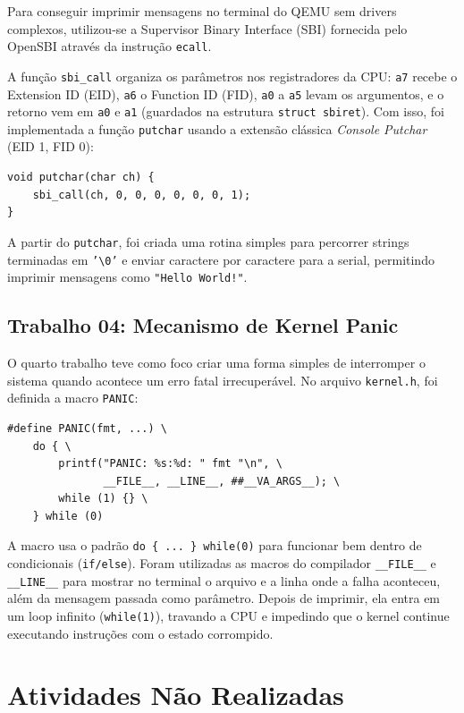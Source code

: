 \documentclass[12pt]{article}
\begin{document}
Para conseguir imprimir mensagens no terminal do QEMU sem drivers complexos, utilizou-se a Supervisor Binary Interface (SBI) fornecida pelo OpenSBI através da instrução \texttt{ecall}.

A função \texttt{sbi\_call} organiza os parâmetros nos registradores da CPU: \texttt{a7} recebe o Extension ID (EID), \texttt{a6} o Function ID (FID), \texttt{a0} a \texttt{a5} levam os argumentos, e o retorno vem em \texttt{a0} e \texttt{a1} (guardados na estrutura \texttt{struct sbiret}). Com isso, foi implementada a função \texttt{putchar} usando a extensão clássica \textit{Console Putchar} (EID 1, FID 0):

\begin{verbatim}
void putchar(char ch) {
    sbi_call(ch, 0, 0, 0, 0, 0, 0, 1);
}
\end{verbatim}

A partir do \texttt{putchar}, foi criada uma rotina simples para percorrer strings terminadas em \texttt{'\textbackslash0'} e enviar caractere por caractere para a serial, permitindo imprimir mensagens como \texttt{"Hello World!"}.

\subsection{Trabalho 04: Mecanismo de Kernel Panic}

O quarto trabalho teve como foco criar uma forma simples de interromper o sistema quando acontece um erro fatal irrecuperável. No arquivo \texttt{kernel.h}, foi definida a macro \texttt{PANIC}:

\begin{verbatim}
#define PANIC(fmt, ...) \
    do { \
        printf("PANIC: %s:%d: " fmt "\n", \
               __FILE__, __LINE__, ##__VA_ARGS__); \
        while (1) {} \
    } while (0)
\end{verbatim}

A macro usa o padrão \texttt{do \{ ... \} while(0)} para funcionar bem dentro de condicionais (\texttt{if/else}). Foram utilizadas as macros do compilador \texttt{\_\_FILE\_\_} e \texttt{\_\_LINE\_\_} para mostrar no terminal o arquivo e a linha onde a falha aconteceu, além da mensagem passada como parâmetro. Depois de imprimir, ela entra em um loop infinito (\texttt{while(1)}), travando a CPU e impedindo que o kernel continue executando instruções com o estado corrompido.

\section{Atividades Não Realizadas}
\end{document}
